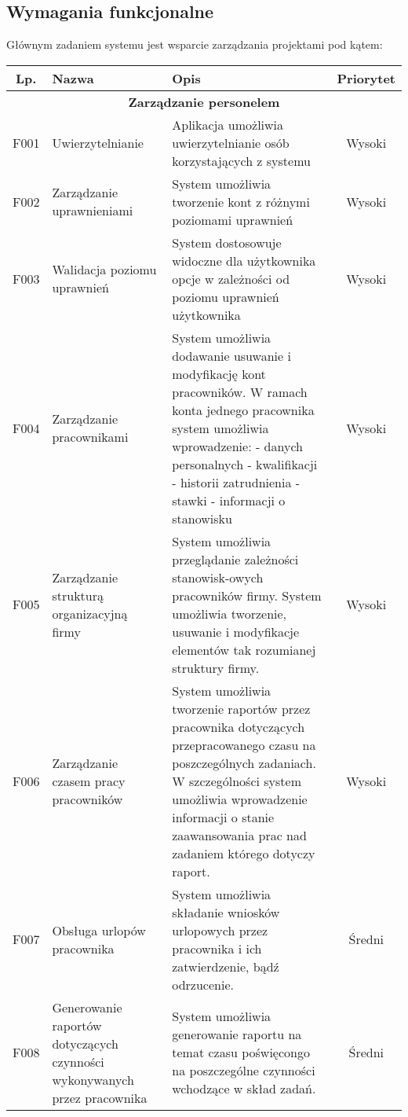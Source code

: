 \subsection{Wymagania funkcjonalne}
\begin{adjustwidth}{2em}{0pt}
Głównym zadaniem systemu jest wsparcie zarządzania projektami pod kątem:

\begin{tabularx}{\textwidth}{|c|X|X|c|}
\hline 
Lp. & Nazwa & Opis & Priorytet \\ 
\hline 
\multicolumn{4}{|c|}{\textbf{Zarządzanie personelem}} \\
\hline 
F001 & Uwierzytelnianie & Aplikacja umożliwia uwierzytelnianie osób korzystających z systemu  & Wysoki \\ 
\hline 
F002 & Zarządzanie uprawnieniami & System umożliwia tworzenie kont z różnymi poziomami uprawnień & Wysoki \\ 
\hline 
F003 & Walidacja poziomu uprawnień & System dostosowuje widoczne dla użytkownika opcje w zależności od poziomu uprawnień użytkownika  & Wysoki \\ 
\hline 
F004 & Zarządzanie pracownikami & System umożliwia dodawanie usuwanie i modyfikację kont pracowników. W ramach konta jednego pracownika system umożliwia wprowadzenie: \newline
- danych personalnych \newline
- kwalifikacji \newline
- historii zatrudnienia \newline 
- stawki \newline
- informacji o stanowisku
& Wysoki \\
\hline 
F005 & Zarządzanie strukturą organizacyjną firmy & System umożliwia przeglądanie zależności stanowisk-owych pracowników firmy. System umożliwia tworzenie, usuwanie i modyfikacje elementów tak rozumianej struktury firmy. & Wysoki \\ 
\hline 
F006 & Zarządzanie czasem pracy pracowników & System umożliwia tworzenie raportów przez pracownika dotyczących przepracowanego czasu na poszczególnych zadaniach. W szczególności system umożliwia wprowadzenie informacji o stanie zaawansowania prac nad zadaniem którego dotyczy raport. & Wysoki \\ 
\hline 
F007 & Obsługa urlopów pracownika & System umożliwia składanie wniosków urlopowych przez pracownika i ich zatwierdzenie, bądź odrzucenie. & Średni\\
\hline 
F008 & Generowanie raportów dotyczących czynności wykonywanych przez pracownika & System umożliwia generowanie raportu na temat czasu poświęcongo na poszczególne czynności wchodzące w skład zadań. & Średni \\

\end{tabularx}
\end{adjustwidth}
